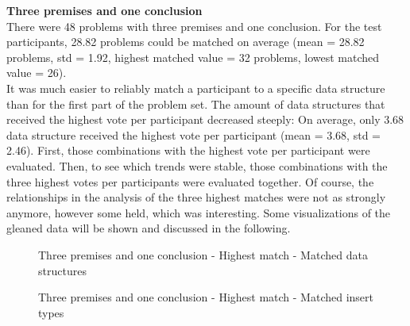 \documentclass[hidelinks]{scrartcl}
\begin{document}
\textbf{Three premises and one conclusion} \\
There were 48 problems with three premises and one conclusion. For the test participants, 28.82 problems could be matched on average (mean = 28.82 problems, std = 1.92, highest matched value = 32 problems, lowest matched value = 26). \\
It was much easier to reliably match a participant to a specific data structure than for the first part of the problem set. The amount of data structures that received the highest vote per participant decreased steeply: On average, only 3.68 data structure received the highest vote per participant (mean = 3.68, std = 2.46). First, those combinations with the highest vote per participant were evaluated. Then, to see which trends were stable, those combinations with the three highest votes per participants were evaluated together. Of course, the relationships in the analysis of the three highest matches were not as strongly anymore, however some held, which was interesting. Some visualizations of the gleaned data will be shown and discussed in the following.

\begin{figure}[H]
	\caption{Three premises and one conclusion - Highest match - Matched data structures}
	\label{img:exp2_4prem_data_structures}
	\begin{center}
	\end{center}
\end{figure}

\begin{figure}[H]
	\caption{Three premises and one conclusion - Highest match - Matched insert types}
	\label{img:exp2_4prem_insert_types}
	\begin{center}
	\end{center}
\end{figure}
\end{document}

